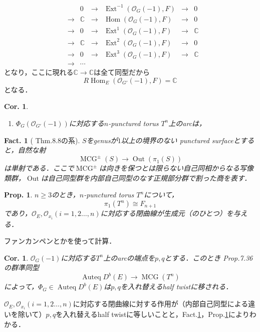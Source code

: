 \documentclass[uplatex,a4paper,11pt,dvipdfmx]{jsarticle}
\makeatletter
\theoremstyle{mystyle} %
\newtheorem{proposition}[theorem]{Prop.}
\newtheorem{corollary}[theorem]{Cor.}
\newtheorem{fact}[theorem]{Fact.}
\renewenvironment{proof}[1][\proofname]{\par
 \pushQED{\qed}%
 \normalfont \topsep6\p@\@plus6\p@\relax
 \trivlist
 \item[\hskip\labelsep
 \itshape
 {\bf\underline{#1}}]\ignorespaces
}{%
 \popQED\endtrivlist\@endpefalse
}
\DeclareMathOperator{\Auteq}{Auteq}\DeclareMathOperator{\Coh}{Coh}
\DeclareMathOperator{\Hom}{Hom}
\DeclareMathOperator{\Ext}{Ext}
\DeclareMathOperator{\MCG}{MCG}
\DeclareMathOperator{\Out}{Out}
\makeatother
\begin{document}
\begin{proof}
\begin{enumerate}
\[\begin{array}{ccccccc}
				       &     & 0          & \to & \Ext^{-1}(\mathcal{O}_G(-1), F) & \to & 0          \\
				       & \to & \mathbb{C} & \to & \Hom(\mathcal{O}_G(-1), F)      & \to & 0          \\
				       & \to & 0          & \to & \Ext^1(\mathcal{O}_G(-1),F)     & \to & \mathbb{C} \\
				       & \to & \mathbb{C} & \to & \Ext^2(\mathcal{O}_G(-1),F)     & \to & 0          \\
				       & \to & 0          & \to & \Ext^3(\mathcal{O}_G(-1),F)     & \to & \mathbb{C} \\
				       & \to & \cdots     &     &                                 &
			      \end{array}
		      \]となり，ここに現れる$\mathbb{C}\to \mathbb{C}$は全て同型だから$$R\Hom_E(\mathcal{O}_{G'}(-1), F) = \mathbb{C}$$となる．
	\end{enumerate}
\end{proof}

\begin{corollary}
	\begin{enumerate}
		\item $\Phi_G(\mathcal{O}_{G'}(-1))$に対応する$n$-punctured torus $T^n$上のarcは，

	\end{enumerate}

\end{corollary}

\begin{fact}[\cite{BD11} Thm.8.8の系]\label{action_on_pi1}
	$S$をgenusが$1$以上の境界のない punctured surfaceとすると，自然な射
	$$\MCG^\pm(S) \to \Out(\pi_1(S))$$は単射である．ここで$\MCG^\pm$は向きを保つとは限らない自己同相からなる写像類群，$\Out$は自己同型群を内部自己同型のなす正規部分群で割った商を表す．
\end{fact}
\begin{proposition}\label{gen_of_pi1}
	$n \geq 3$のとき，$n$-punctured torus $T^n$について，$$\pi_1(T^n) \cong F_{n+1}$$であり，$\mathcal{O}_E, \mathcal{O}_{x_i}(i=1,2 \dots, n)$に対応する閉曲線が生成元（のひとつ）を与える．
\end{proposition}
\begin{proof}
	ファンカンペンとかを使って計算．
\end{proof}

\begin{corollary}
	$\mathcal{O}_G(-1)$に対応する$T^n$上のarcの端点を$p, q$とする．このとき\cite{Opp20} Prop.7.36 の群準同型$$\Auteq D^b(E) \to \MCG(T^n)$$によって，$\Phi_G \in \Auteq D^b(E)$は$p, q$を入れ替えるhalf twistに移される．
\end{corollary}
\begin{proof}
	$\mathcal{O}_E, \mathcal{O}_{x_i}(i=1,2 \dots, n)$に対応する閉曲線に対する作用が（内部自己同型による違いを除いて）$p, q$を入れ替えるhalf twistに等しいことと，Fact.\ref{action_on_pi1}，Prop.\ref{gen_of_pi1}によりわかる．
\end{proof}
\end{document}
